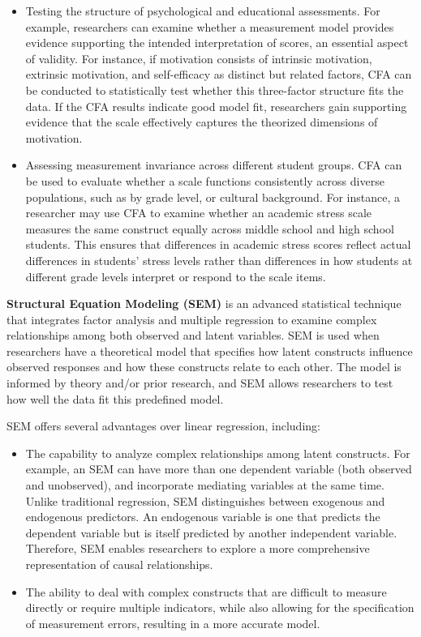\documentclass[
  letterpaper,
  DIV=11,
  numbers=noendperiod]{scrreprt}
\begin{document}
\begin{itemize}
\item
  Testing the structure of psychological and educational assessments.
  For example, researchers can examine whether a measurement model
  provides evidence supporting the intended interpretation of scores, an
  essential aspect of validity. For instance, if motivation consists of
  intrinsic motivation, extrinsic motivation, and self-efficacy as
  distinct but related factors, CFA can be conducted to statistically
  test whether this three-factor structure fits the data. If the CFA
  results indicate good model fit, researchers gain supporting evidence
  that the scale effectively captures the theorized dimensions of
  motivation.
\item
  Assessing measurement invariance across different student groups. CFA
  can be used to evaluate whether a scale functions consistently across
  diverse populations, such as by grade level, or cultural background.
  For instance, a researcher may use CFA to examine whether an academic
  stress scale measures the same construct equally across middle school
  and high school students. This ensures that differences in academic
  stress scores reflect actual differences in students' stress levels
  rather than differences in how students at different grade levels
  interpret or respond to the scale items.
\end{itemize}

\textbf{Structural Equation Modeling (SEM)} is an advanced statistical
technique that integrates factor analysis and multiple regression to
examine complex relationships among both observed and latent variables.
SEM is used when researchers have a theoretical model that specifies how
latent constructs influence observed responses and how these constructs
relate to each other. The model is informed by theory and/or prior
research, and SEM allows researchers to test how well the data fit this
predefined model.

SEM offers several advantages over linear regression, including:

\begin{itemize}
\item
  The capability to analyze complex relationships among latent
  constructs. For example, an SEM can have more than one dependent
  variable (both observed and unobserved), and incorporate mediating
  variables at the same time. Unlike traditional regression, SEM
  distinguishes between exogenous and endogenous predictors. An
  endogenous variable is one that predicts the dependent variable but is
  itself predicted by another independent variable. Therefore, SEM
  enables researchers to explore a more comprehensive representation of
  causal relationships.
\item
  The ability to deal with complex constructs that are difficult to
  measure directly or require multiple indicators, while also allowing
  for the specification of measurement errors, resulting in a more
  accurate model.
\end{itemize}
\end{document}
